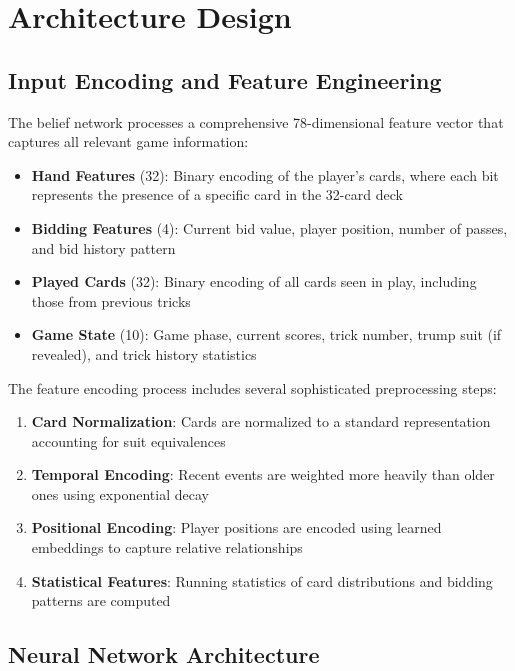 \documentclass[conference]{IEEEtran}
\begin{document}
\section{Architecture Design}

\subsection{Input Encoding and Feature Engineering}

The belief network processes a comprehensive 78-dimensional feature vector that captures all relevant game information:

\begin{itemize}
    \item \textbf{Hand Features} (32): Binary encoding of the player's cards, where each bit represents the presence of a specific card in the 32-card deck
    \item \textbf{Bidding Features} (4): Current bid value, player position, number of passes, and bid history pattern
    \item \textbf{Played Cards} (32): Binary encoding of all cards seen in play, including those from previous tricks
    \item \textbf{Game State} (10): Game phase, current scores, trick number, trump suit (if revealed), and trick history statistics
\end{itemize}

The feature encoding process includes several sophisticated preprocessing steps:

\begin{enumerate}
    \item \textbf{Card Normalization}: Cards are normalized to a standard representation accounting for suit equivalences
    \item \textbf{Temporal Encoding}: Recent events are weighted more heavily than older ones using exponential decay
    \item \textbf{Positional Encoding}: Player positions are encoded using learned embeddings to capture relative relationships
    \item \textbf{Statistical Features}: Running statistics of card distributions and bidding patterns are computed
\end{enumerate}

\subsection{Neural Network Architecture}
\end{document}
